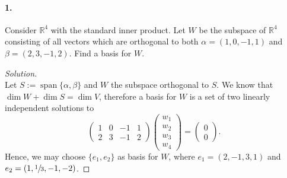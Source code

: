 \documentclass{article}
\theoremstyle{plain}
\theoremstyle{definition}
\theoremstyle{remark}
\renewcommand{\Re}{\mathbb{R}}
\DeclareMathOperator{\Span}{span}
\begin{document}
    \paragraph{1.}
    Consider $\Re^4$ with the standard inner product. Let $W$ be the subspace of $\Re^4$ consisting of all vectors which are orthogonal to both $\alpha=(1,0,-1,1)$ and $\beta =(2,3,-1,2)$. Find a basis for $W$.
      \begin{proof}[Solution]$ $\\
        Let $S:=\Span\{\alpha,\beta\}$ and $W$ the subspace orthogonal to $S$. We know that $\dim W + \dim S = \dim V$, therefore a basis for $W$ is a set of two linearly independent solutions to
        $$  \left( \begin{matrix}
                      1 & 0 & -1 & 1 \\
                      2 & 3 & -1 & 2
            \end{matrix} \right) \left( \begin{matrix} w_1 \\ w_2 \\ w_3 \\ w_4 \end{matrix} \right) = \left( \begin{matrix} 0 \\ 0 \end{matrix} \right).
        $$
        Hence, we may choose $\{e_1,e_2\}$ as basis for $W$, where $e_1 = (2,-1,3,1)$ and $e_2= (1,\sfrac{1}{3},-1,-2)$.
      \end{proof}
\end{document}
